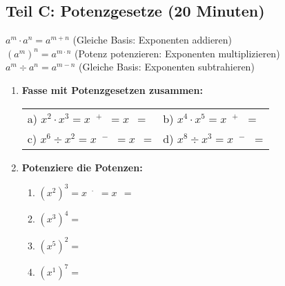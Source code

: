 \subsection*{Teil C: Potenzgesetze (20 Minuten)}

\begin{merkbox}[Potenzgesetze]
    $a^m \cdot a^n = a^{m+n}$ \quad (Gleiche Basis: Exponenten addieren)\\
    $(a^m)^n = a^{m \cdot n}$ \quad (Potenz potenzieren: Exponenten multiplizieren)\\
    $a^m \div a^n = a^{m-n}$ \quad (Gleiche Basis: Exponenten subtrahieren)
\end{merkbox}

\begin{enumerate}[label=\arabic*., resume]

    \item \textbf{Fasse mit Potenzgesetzen zusammen:}

    \vspace{0.5cm}

    \begin{tabular}{ll}
        a) $x^2 \cdot x^3 = x^{\phantom{0}+\phantom{0}} = x^{\phantom{0}}$ = \underline{\hspace{2cm}} & b) $x^4 \cdot x^5 = x^{\phantom{0}+\phantom{0}}$ = \underline{\hspace{2cm}} \\[3ex]
        c) $x^6 \div x^2 = x^{\phantom{0}-\phantom{0}} = x^{\phantom{0}}$ = \underline{\hspace{2cm}} & d) $x^8 \div x^3 = x^{\phantom{0}-\phantom{0}}$ = \underline{\hspace{2cm}}
    \end{tabular}

    \vspace{1cm}

    \item \textbf{Potenziere die Potenzen:}

    \vspace{0.5cm}

    \begin{enumerate}[label=\alph*)]
        \item $(x^2)^3 = x^{\phantom{0} \cdot \phantom{0}} = x^{\phantom{0}}$ = \underline{\hspace{2cm}}
        \vspace{0.3cm}
        \item $(x^3)^4 = $ \underline{\hspace{3cm}}
        \vspace{0.3cm}
        \item $(x^5)^2 = $ \underline{\hspace{3cm}}
        \vspace{0.3cm}
        \item $(x^1)^7 = $ \underline{\hspace{3cm}}
    \end{enumerate}


\end{enumerate}
